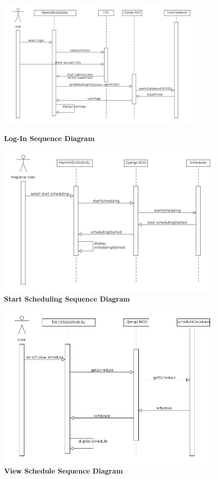\documentclass[11pt]{article}
\begin{document}
\begin{figure}
	\centering
		\includegraphics[width = 0.9\textwidth]{logInSequence.png}
	\caption{\textbf{Log-In Sequence Diagram}}
	\label{fig:logInSeq}
\vspace{0.4in}
		\includegraphics[width = .9\textwidth]{startSchedulingSequence.png}
	\caption{\bf Start Scheduling Sequence Diagram}
	\label{fig:startSeq}
\end{figure}


\begin{figure}
	\centering
		\includegraphics[width = \textwidth]{viewScheduleSequence.png}
	\caption{\bf View Schedule Sequence Diagram}
	\label{fig:viewSeq}
\end{figure}
\end{document}

